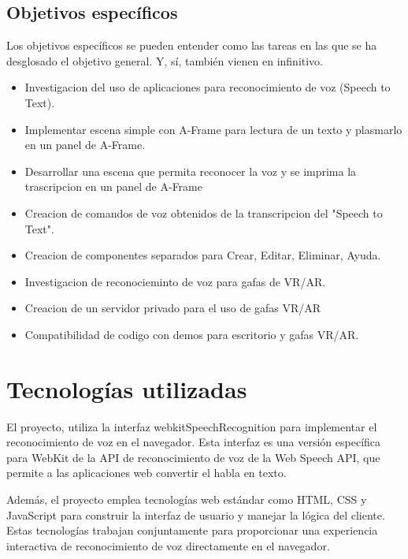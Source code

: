 \documentclass[a4paper, 12pt]{book}
\let\cleardoublepage\clearpage
\begin{document}
\section{Objetivos específicos}
\label{sec:objetivos-especificos}

Los objetivos específicos se pueden entender como las tareas en las que se ha desglosado el objetivo general.
Y, sí, también vienen en infinitivo.
\begin{itemize}
\item Investigacion del uso de aplicaciones para reconocimiento de voz (Speech to Text).
\item Implementar escena simple con A-Frame para lectura de un texto y plasmarlo en un panel de A-Frame.
\item Desarrollar una escena que permita reconocer la voz y se imprima la trascripcion en un panel de A-Frame
\item Creacion de comandos de voz obtenidos de la transcripcion del "Speech to Text".
\item Creacion de componentes separados para Crear, Editar, Eliminar, Ayuda.
\item Investigacion de reconocieminto de voz para gafas de VR/AR.
\item Creacion de un servidor privado para el uso de gafas VR/AR
\item Compatibilidad de codigo con demos para escritorio y gafas VR/AR.
\end{itemize}


\cleardoublepage
\cleardoublepage %

\chapter{Tecnologías utilizadas}
\label{chap:Tecnologías utilizadas}

El proyecto, utiliza la interfaz webkitSpeechRecognition para implementar el reconocimiento de voz en el navegador. Esta interfaz es una versión específica para WebKit de la API de reconocimiento de voz de la Web Speech API, que permite a las aplicaciones web convertir el habla en texto.

Además, el proyecto emplea tecnologías web estándar como HTML, CSS y JavaScript para construir la interfaz de usuario y manejar la lógica del cliente. Estas tecnologías trabajan conjuntamente para proporcionar una experiencia interactiva de reconocimiento de voz directamente en el navegador.
\end{document}
